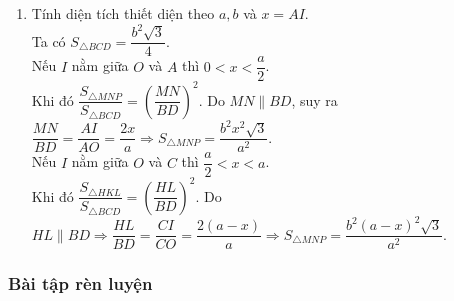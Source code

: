 \begin{vd}
{\begin{enumerate}
{			}	
			\noindent
			Nếu $I \in OC$ thì thiết diện là tam giác đều $HKL$ có các cạnh tương ứng song song với cạnh tam giác $SBD$.
			\item Tính diện tích thiết diện theo $a,b$ và $x=AI$.\\
			Ta có $S_{\triangle BCD}=\dfrac{b^2\sqrt{3}}{4}$.\\
			Nếu $I$ nằm giữa $O$ và $A$ thì $0<x<\dfrac{a}{2}$.\\
			Khi đó $\dfrac{S_{\triangle MNP}}{S_{\triangle BCD}}=\left(\dfrac{MN}{BD}\right)^2$. Do $MN \parallel BD$, suy ra $\dfrac{MN}{BD}=\dfrac{AI}{AO}=\dfrac{2x}{a} \Rightarrow S_{\triangle MNP}=\dfrac{b^2x^2\sqrt{3}}{a^2}$.\\
			Nếu $I$ nằm giữa $O$ và $C$  thì $\dfrac{a}{2}<x<a$.\\
			Khi đó $\dfrac{S_{\triangle HKL}}{S_{\triangle BCD}}=\left(\dfrac{HL}{BD}\right)^2$. Do $HL \parallel BD\Rightarrow \dfrac{HL}{BD}=\dfrac{CI}{CO}=\dfrac{2(a-x)}{a} \Rightarrow S_{\triangle MNP}=\dfrac{b^2(a-x)^2\sqrt{3}}{a^2}$.			
		\end{enumerate}
		
	}
\end{vd}

\subsubsection{Bài tập rèn luyện}
\centerline{}

